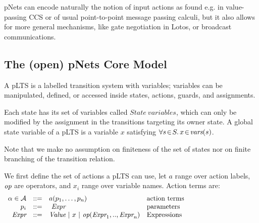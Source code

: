 \documentclass{lncs/llncs}
\def\AlgA{\mathcal{A}}
\begin{document}
pNets can encode naturally the notion of input actions as found e.g. in value-passing CCS
\cite{Milner89} or of usual point-to-point message passing calculi, but it also allows
for more general mechanisms, like gate negotiation in Lotos, or broadcast
communications.




\subsection{The (open) pNets Core Model}
\label{section:pNets}


A pLTS is a labelled transition system with variables; variables can be
manipulated, defined, or accessed inside states, actions, guards, and
assignments. 


Each state has its set of variables called $State\ variables$, 
which can only be modified by the assignment in the transitions targeting its owner state. 
A global state variable of a pLTS is a variable $x$ satisfying $\forall s\!\in\! S .\, x\!\in\! \vars(s)$.

Note that we make no assumption on finiteness of the set of states nor
on finite branching of the transition relation.

We first define the set of actions a pLTS can use, let $a$
range over action labels, $\symb{op}$ are operators, and $x_i$ range over
variable names. Action terms are:
\[
\begin{array}[l]{rcl@{\quad}p{5.5cm}}
  \alpha\in\AlgA&::=&a(p_1,\ldots,p_n)&\text{action terms}\\
  p_i&::=& ~\symb{Expr}&\text{parameters}\\
  \symb{Expr}&::=& \symb{Value}~|~x~|~\symb{op}(\symb{Expr}_1,..,\symb{Expr}_n)&\text{Expressions}
\end{array}
\]
\end{document}
